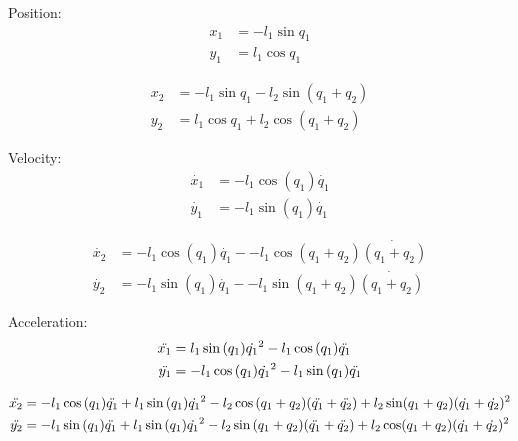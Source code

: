 Position:
\begin{equation}
\begin{split}
    x_1 &= -l_1\sin{q_1} \\
    y_1 &= l_1\cos{q_1}
\end{split}
\end{equation}

\begin{equation}
\begin{split}
    x_2 &= -l_1\sin{q_1} - l_2\sin{(q_1+q_2)} \\
    y_2 &= l_1\cos{q_1} + l_2\cos{(q_1+q_2)}
\end{split}
\end{equation}

Velocity:
\begin{equation}
\begin{split}
    \Dot{x_1} &= -l_1\cos(q_1)\Dot{q_1} \\
    \Dot{y_1} &= -l_1\sin(q_1)\Dot{q_1}
\end{split}
\end{equation}

\begin{equation}
\begin{split}
    \Dot{x_2} &= -l_1\cos(q_1)\Dot{q_1} - -l_1\cos(q_1+q_2)\Dot{(q_1+q_2)} \\
    \Dot{y_2} &= -l_1\sin(q_1)\Dot{q_1} - -l_1\sin(q_1+q_2)\Dot{(q_1+q_2)}
\end{split}
\end{equation}

Acceleration:
\begin{equation}
\begin{split}
    \Ddot{x_1} &= l_1 \sin{(q_1)}\Dot{q_1}^2 - l_1 \cos{(q_1)}\Ddot{q_1} \\
    \Ddot{y_1} &= -l_1 \cos{(q_1)}\Dot{q_1}^2 - l_1 \sin{(q_1)}\Ddot{q_1}
\end{split}
\end{equation}

\begin{equation}
\begin{split}
    \Ddot{x_2} &= -l_1\cos{(q_1)}\Ddot{q_1} + l_1\sin{(q_1)}\Dot{q_1}^2 - l_2\cos{(q_1+q_2)}(\Ddot{q_1} + \Ddot{q_2}) + l_2\sin(q_1+q_2)(\Dot{q_1} + \Dot{q_2})^2 \\
    \Ddot{y_2} &= -l_1\sin{(q_1)}\Ddot{q_1} + l_1\sin{(q_1)}\Dot{q_1}^2 - l_2\sin{(q_1+q_2)}(\Ddot{q_1} + \Ddot{q_2}) + l_2\cos(q_1+q_2)(\Dot{q_1} + \Dot{q_2})^2
\end{split}
\end{equation}

